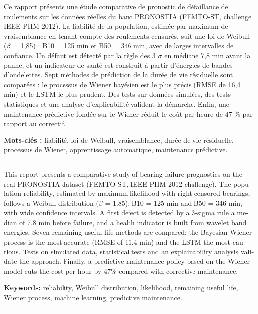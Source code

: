 \clearpage\pagestyle{empty}\thispagestyle{empty}
\small

\par\medskip

Ce rapport présente une étude comparative de pronostic de défaillance de roulements sur les données réelles du banc PRONOSTIA (FEMTO-ST, challenge IEEE PHM 2012). La fiabilité de la population, estimée par maximum de vraisemblance en tenant compte des roulements censurés, suit une loi de Weibull ($\beta$ = 1,85) : B10 = 125 min et B50 = 346 min, avec de larges intervalles de confiance. Un défaut est détecté par la règle des 3 $\sigma$ en médiane 7,8 min avant la panne, et un indicateur de santé est construit à partir d'énergies de bandes d'ondelettes. Sept méthodes de prédiction de la durée de vie résiduelle sont comparées : le processus de Wiener bayésien est le plus précis (RMSE de 16,4 min) et le LSTM le plus prudent. Des tests sur données simulées, des tests statistiques et une analyse d'explicabilité valident la démarche. Enfin, une maintenance prédictive fondée sur le Wiener réduit le coût par heure de 47 \% par rapport au correctif.

\textbf{Mots-clés :} fiabilité, loi de Weibull, vraisemblance, durée de vie résiduelle, processus de Wiener, apprentissage automatique, maintenance prédictive.

\par\medskip\noindent\rule{\linewidth}{0.4pt}\par\medskip
\begin{otherlanguage}{english}
\par\medskip

This report presents a comparative study of bearing failure prognostics on the real PRONOSTIA dataset (FEMTO-ST, IEEE PHM 2012 challenge). The population reliability, estimated by maximum likelihood with right-censored bearings, follows a Weibull distribution ($\beta$ = 1.85): B10 = 125 min and B50 = 346 min, with wide confidence intervals. A first defect is detected by a 3-sigma rule a median of 7.8 min before failure, and a health indicator is built from wavelet band energies. Seven remaining useful life methods are compared: the Bayesian Wiener process is the most accurate (RMSE of 16.4 min) and the LSTM the most cautious. Tests on simulated data, statistical tests and an explainability analysis validate the approach. Finally, a predictive maintenance policy based on the Wiener model cuts the cost per hour by 47\% compared with corrective maintenance.

\textbf{Keywords:} reliability, Weibull distribution, likelihood, remaining useful life, Wiener process, machine learning, predictive maintenance.
\end{otherlanguage}

\par\medskip\noindent\rule{\linewidth}{0.4pt}\par\medskip
\resumearabe
